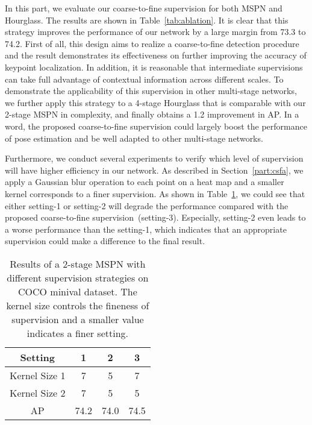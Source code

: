 \documentclass[10pt,twocolumn,letterpaper]{article}
\begin{document}
In this part, we evaluate our coarse-to-fine supervision for both MSPN and Hourglass. The results are shown in Table~\ref{tab:ablation}. It is clear that this strategy improves the performance of our network by a large margin from 73.3 to 74.2. First of all, this design aims to realize a coarse-to-fine detection procedure and the result demonstrates its effectiveness on further improving the accuracy of keypoint localization. In addition, it is reasonable that intermediate supervisions can take full advantage of contextual information across different scales. To demonstrate the applicability of this supervision in other multi-stage networks, we further apply this strategy to a 4-stage Hourglass that is comparable with our 2-stage MSPN in complexity, and finally obtains a 1.2 improvement in AP. In a word, the proposed coarse-to-fine supervision could largely boost the performance of pose estimation and be well adapted to other multi-stage networks.

Furthermore, we conduct several experiments to verify which level of supervision will have higher efficiency in our network. As described in Section~\ref{part:csfa}, we apply a Gaussian blur operation to each point on a heat map and a smaller kernel corresponds to a finer supervision. As shown in Table~\ref{tab:supervision}, we could see that either setting-1 or setting-2 will degrade the performance compared with the proposed coarse-to-fine supervision~(setting-3). Especially, setting-2 even leads to a worse performance than the setting-1, which indicates that an appropriate supervision could make a difference to the final result.

\begin{table}[h]
	\begin{spacing}{1.1}
		\begin{center}
			\begin{tabular}{c|c c c}
				\hline
				Setting & 1 & 2 & 3 \\
				\hline
				Kernel Size 1  & 7 & 5 & 7 \\
				Kernel Size 2  & 7 & 5 & 5 \\
				\hline
				AP & 74.2 & 74.0 & 74.5 \\
				\hline
			\end{tabular}
		\end{center}
		\caption{Results of a 2-stage MSPN with different supervision strategies on COCO minival dataset. The kernel size controls the fineness of supervision and a smaller value indicates a finer setting.}
		\label{tab:supervision}
	\end{spacing}
\end{table}
\end{document}

